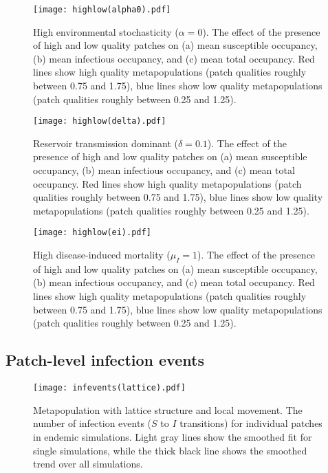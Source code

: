 \documentclass{svjour3}
\begin{document}
\begin{figure}
\centering
\texttt{[image: highlow(alpha0).pdf]}
\caption{High environmental stochasticity ($\alpha = 0$).  The effect of the presence of high and low quality patches on (a) mean susceptible occupancy, (b) mean infectious occupancy, and (c) mean total occupancy.  Red lines show high quality metapopulations (patch qualities roughly between 0.75 and 1.75), blue lines show low quality metapopulations (patch qualities roughly between 0.25 and 1.25).}
\label{sens_x0}
\end{figure}

\begin{figure}
\centering
\texttt{[image: highlow(delta).pdf]}
\caption{Reservoir transmission dominant ($\delta = 0.1$).  The effect of the presence of high and low quality patches on (a) mean susceptible occupancy, (b) mean infectious occupancy, and (c) mean total occupancy.  Red lines show high quality metapopulations (patch qualities roughly between 0.75 and 1.75), blue lines show low quality metapopulations (patch qualities roughly between 0.25 and 1.25).}
\label{sens_delta}
\end{figure}

\begin{figure}
\centering
\texttt{[image: highlow(ei).pdf]}
\caption{High disease-induced mortality ($\mu_I = 1$).  The effect of the presence of high and low quality patches on (a) mean susceptible occupancy, (b) mean infectious occupancy, and (c) mean total occupancy.  Red lines show high quality metapopulations (patch qualities roughly between 0.75 and 1.75), blue lines show low quality metapopulations (patch qualities roughly between 0.25 and 1.25).}
\label{sens_ei}
\end{figure}

\clearpage

\subsection{Patch-level infection events}

\begin{figure}[h!]
\centering
\texttt{[image: infevents(lattice).pdf]}
\caption{Metapopulation with lattice structure and local movement.  The number of infection events ($S$ to $I$ transitions) for individual patches in endemic simulations.  Light gray lines show the smoothed fit for single simulations, while the thick black line shows the smoothed trend over all simulations.}
\label{infections_lattice}
\end{figure}
\end{document}
